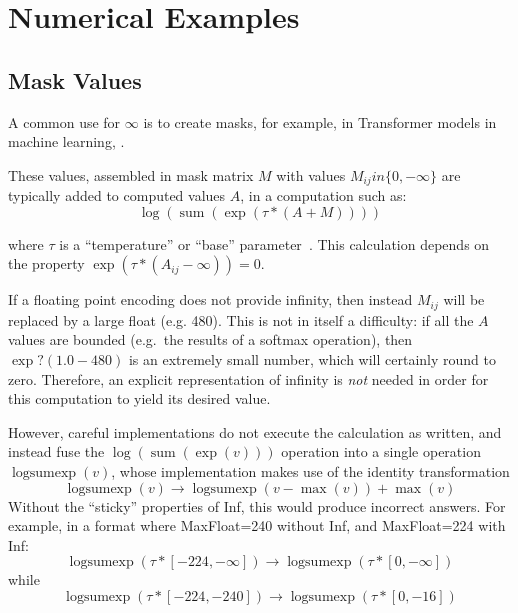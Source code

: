 \documentclass{article}
\begin{document}



\appendix
\section{Numerical Examples}

\subsection{Mask Values}
\def\sumop{\operatorname{sum}}
\def\logsumexp{\operatorname{logsumexp}}
A common use for $\infty$ is to create masks, for example, in Transformer models in machine learning, \cite{torchtext:inf}.

These values, assembled in mask matrix $M$ with values $M_{ij} in \{0,-\infty\}$ are typically added to computed values $A$,  in a computation such as:
\[
\log(\sumop(\exp(\tau * (A + M))))
\]

where $\tau$ is a ``temperature'' or ``base'' parameter~\cite{softmax}.
This calculation depends on the property $\exp(\tau*(A_{ij}-\infty))=0$.

If a floating point encoding does not provide infinity, then instead $M_{ij}$ will be replaced by a large float (e.g. 480).  This is not in itself a difficulty: if all the $A$ values are bounded (e.g.\ the results of a softmax operation), then $\exp?(1.0-480)$ is an extremely small number, which will certainly round to zero.
Therefore, an explicit representation of infinity is {\em not} needed in order for this computation to yield its desired value.

However, careful implementations do not execute the calculation as written,
and instead fuse the $\log(\sumop(\exp(v)))$ operation into a single operation $\logsumexp(v)$,
whose implementation makes use of the identity transformation
\[
\logsumexp(v) \rightarrow \logsumexp(v-\max(v)) + \max(v)
\]
Without the ``sticky'' properties of Inf, this would produce incorrect answers.
For example, in a format where MaxFloat=240 without Inf, and MaxFloat=224 with Inf:
\[
\logsumexp(\tau*[-224,-\infty]) \rightarrow \logsumexp(\tau*[0,-\infty])
\]
while
\[
\logsumexp(\tau*[-224,-240]) \rightarrow \logsumexp(\tau*[0,-16])
\]
\end{document}

